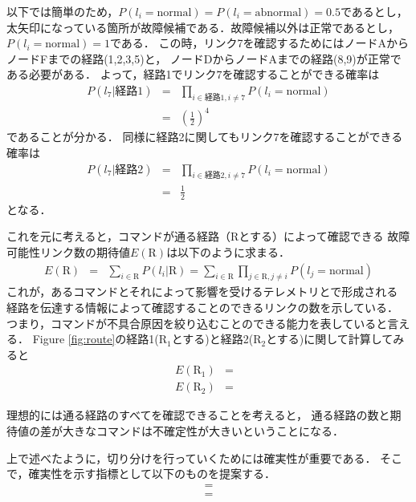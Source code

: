 \documentclass[11pt]{article}
\begin{document}
以下では簡単のため，$P(l_i = \text{normal}) = P(l_i = \text{abnormal}) = 0.5$であるとし，
太矢印になっている箇所が故障候補である．故障候補以外は正常であるとし，
$P(l_i = \text{normal}) =1$である．
この時，リンク7を確認するためにはノードAからノードFまでの経路(1,2,3,5)と，
ノードDからノードAまでの経路(8,9)が正常である必要がある．%
よって，経路1でリンク$7$を確認することができる確率は
\begin{eqnarray}
   P(l_{7} | \text{経路}1) &=& \prod_{i\in\text{経路1},i\neq 7} P(l_{i} = \text{normal})\\
     &=& \left( \frac{1}{2}\right)^4
\end{eqnarray}
であることが分かる．
同様に経路2に関してもリンク$7$を確認することができる確率は
\begin{eqnarray}
   P(l_{7} | \text{経路}2)  &=& \prod_{i\in\text{経路2},i\neq 7} P(l_{i} = \text{normal})\\
   &=& \frac{1}{2}
\end{eqnarray}
となる．

これを元に考えると，コマンドが通る経路（Rとする）によって確認できる
故障可能性リンク数の期待値$E(\text{R})$は以下のように求まる．
\begin{eqnarray}
   E(\text{R})&=& \sum_{i\in \text{R}}P(l_i|\text{R})
   = \sum_{i\in \text{R}}\prod_{j\in \text{R}, j\neq i} P(l_j=\text{normal})
\end{eqnarray}
これが，あるコマンドとそれによって影響を受けるテレメトリとで形成される
経路を伝達する情報によって確認することのできるリンクの数を示している．
つまり，コマンドが不具合原因を絞り込むことのできる能力を表していると言える．
Figure \ref{fig:route}の経路1(R$_1$とする)と経路2(R$_2$とする)に関して計算してみると
\begin{eqnarray}
   E(\text{R}_1)  &=&  \\
   E(\text{R}_2)  &=& 
\end{eqnarray}

理想的には通る経路のすべてを確認できることを考えると，
通る経路の数と期待値の差が大きなコマンドは不確定性が大きいということになる．

上で述べたように，切り分けを行っていくためには確実性が重要である．
そこで，確実性を示す指標として以下のものを提案する．
\begin{eqnarray}
     &=&  \\
     &=& 
\end{eqnarray}
\end{document}
